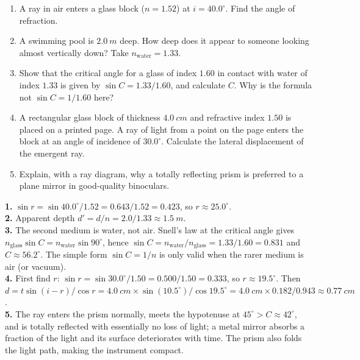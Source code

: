 \documentclass[11pt]{article}
\begin{document}
\begin{exercice}[Practice]
\begin{enumerate}
\item A ray in air enters a glass block ($n = 1.52$) at $i = 40.0^{\circ}$. Find the angle of refraction.
\item A swimming pool is $\SI{2.0}{m}$ deep. How deep does it appear to someone looking almost vertically down? Take $n_{\text{water}} = 1.33$.
\item Show that the critical angle for a glass of index $1.60$ in contact with water of index $1.33$ is given by $\sin C = 1.33/1.60$, and calculate $C$. Why is the formula not $\sin C = 1/1.60$ here?
\item A rectangular glass block of thickness $\SI{4.0}{cm}$ and refractive index $1.50$ is placed on a printed page. A ray of light from a point on the page enters the block at an angle of incidence of $30.0^{\circ}$. Calculate the lateral displacement of the emergent ray.
\item Explain, with a ray diagram, why a totally reflecting prism is preferred to a plane mirror in good-quality binoculars.
\end{enumerate}
\end{exercice}

\begin{corrige}[Exercise 1]
\textbf{1.} $\sin r = \sin 40.0^{\circ}/1.52 = 0.643/1.52 = 0.423$, so $r \approx 25.0^{\circ}$.\\
\textbf{2.} Apparent depth $d' = d/n = 2.0/1.33 \approx \SI{1.5}{m}$.\\
\textbf{3.} The second medium is water, not air. Snell's law at the critical angle gives $n_{\text{glass}}\sin C = n_{\text{water}}\sin 90^{\circ}$, hence $\sin C = n_{\text{water}}/n_{\text{glass}} = 1.33/1.60 = 0.831$ and $C \approx 56.2^{\circ}$. The simple form $\sin C = 1/n$ is only valid when the rarer medium is air (or vacuum).\\
\textbf{4.} First find $r$: $\sin r = \sin 30.0^{\circ}/1.50 = 0.500/1.50 = 0.333$, so $r \approx 19.5^{\circ}$. Then $d = t\sin(i-r)/\cos r = \SI{4.0}{cm} \times \sin(10.5^{\circ})/\cos 19.5^{\circ} = \SI{4.0}{cm} \times 0.182/0.943 \approx \SI{0.77}{cm}$.\\
\textbf{5.} The ray enters the prism normally, meets the hypotenuse at $45^{\circ} > C \approx 42^{\circ}$, and is totally reflected with essentially no loss of light; a metal mirror absorbs a fraction of the light and its surface deteriorates with time. The prism also folds the light path, making the instrument compact.
\end{corrige}
\end{document}
